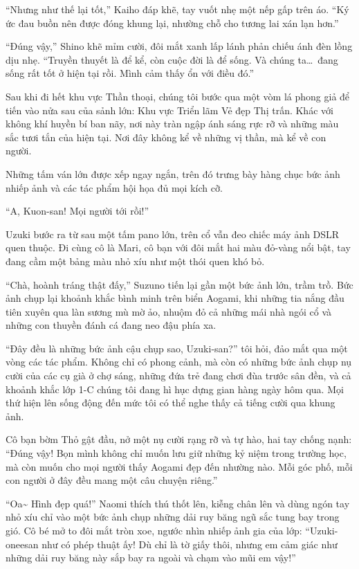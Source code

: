 \documentclass[../main.tex]{subfiles}
\begin{document}
``Nhưng như thế lại tốt,'' Kaiho đáp khẽ, tay vuốt nhẹ một nếp gấp trên áo. ``Ký ức đau buồn nên được đóng khung lại, nhường chỗ cho tương lai xán lạn hơn.''

``Đúng vậy,'' Shino khẽ mỉm cười, đôi mắt xanh lấp lánh phản chiếu ánh đèn lồng dịu nhẹ. ``Truyền thuyết là để kể, còn cuộc đời là để sống. Và chúng ta\dots\ đang sống rất tốt ở hiện tại rồi. Mình cảm thấy ổn với điều đó.''

\ct

Sau khi đi hết khu vực Thần thoại, chúng tôi bước qua một vòm lá phong giả để tiến vào nửa sau của sảnh lớn: Khu vực Triển lãm Vẻ đẹp Thị trấn. Khác với không khí huyền bí ban nãy, nơi này tràn ngập ánh sáng rực rỡ và những màu sắc tươi tắn của hiện tại. Nơi đây không kể về những vị thần, mà kể về con người.

Những tấm ván lớn được xếp ngay ngắn, trên đó trưng bày hàng chục bức ảnh nhiếp ảnh và các tác phẩm hội họa đủ mọi kích cỡ.

``A, Kuon-san! Mọi người tới rồi!''

Uzuki bước ra từ sau một tấm pano lớn, trên cổ vẫn đeo chiếc máy ảnh DSLR quen thuộc. Đi cùng cô là Mari, cô bạn với đôi mắt hai màu đỏ-vàng nổi bật, tay đang cầm một bảng màu nhỏ xíu như một thói quen khó bỏ.

``Chà, hoành tráng thật đấy,'' Suzuno tiến lại gần một bức ảnh lớn, trầm trồ. Bức ảnh chụp lại khoảnh khắc bình minh trên biển Aogami, khi những tia nắng đầu tiên xuyên qua làn sương mù mờ ảo, nhuộm đỏ cả những mái nhà ngói cổ và những con thuyền đánh cá đang neo đậu phía xa.

``Đây đều là những bức ảnh cậu chụp sao, Uzuki-san?'' tôi hỏi, đảo mắt qua một vòng các tác phẩm. Không chỉ có phong cảnh, mà còn có những bức ảnh chụp nụ cười của các cụ già ở chợ sáng, những đứa trẻ đang chơi đùa trước sân đền, và cả khoảnh khắc lớp 1-C chúng tôi đang hì hục dựng gian hàng ngày hôm qua. Mọi thứ hiện lên sống động đến mức tôi có thể nghe thấy cả tiếng cười qua khung ảnh.

Cô bạn bờm Thỏ gật đầu, nở một nụ cười rạng rỡ và tự hào, hai tay chống nạnh: ``Đúng vậy! Bọn mình không chỉ muốn lưu giữ những kỷ niệm trong trường học, mà còn muốn cho mọi người thấy Aogami đẹp đến nhường nào. Mỗi góc phố, mỗi con người ở đây đều mang một câu chuyện riêng.''

``Oa\~{} Hình đẹp quá!'' Naomi thích thú thốt lên, kiễng chân lên và dùng ngón tay nhỏ xíu chỉ vào một bức ảnh chụp những dải ruy băng ngũ sắc tung bay trong gió. Cô bé mở to đôi mắt tròn xoe, ngước nhìn nhiếp ảnh gia của lớp: ``Uzuki-oneesan như có phép thuật ấy! Dù chỉ là tờ giấy thôi, nhưng em cảm giác như những dải ruy băng này sắp bay ra ngoài và chạm vào mũi em vậy!''
\end{document}
